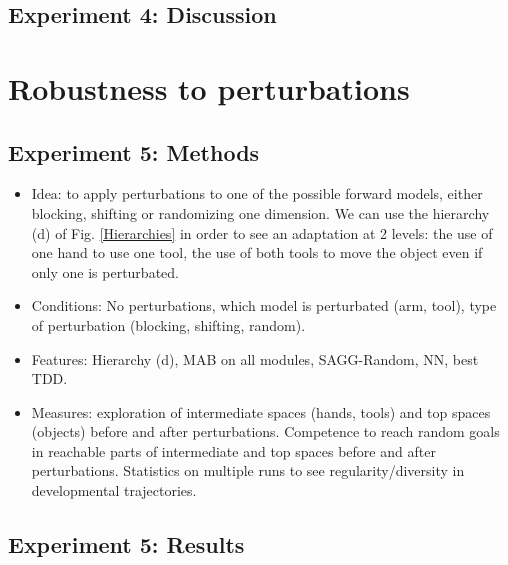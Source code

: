 \documentclass[conference]{include/IEEEtran}
\begin{document}
		
	
	\subsection{Experiment 4: Discussion}	
	
	

%
	
\section{Robustness to perturbations}

	
	\subsection{Experiment 5: Methods}	
		
		\begin{itemize}
			\item Idea: to apply perturbations to one of the possible forward models, either blocking, shifting or randomizing one dimension. 
					We can use the hierarchy (d) of Fig. \ref{Hierarchies} in order to see an adaptation at 2 levels: the use of one hand to use one tool, the use of both tools to move the object even if only one is perturbated.
			
			\item Conditions: No perturbations, which model is perturbated (arm, tool), type of perturbation (blocking, shifting, random).
			
			\item Features: Hierarchy (d), MAB on all modules, SAGG-Random, NN, best TDD.
			
			\item Measures: exploration of intermediate spaces (hands, tools) and top spaces (objects) before and after perturbations. 
					Competence to reach random goals in reachable parts of intermediate and top spaces before and after perturbations. 
					Statistics on multiple runs to see regularity/diversity in developmental trajectories.
		\end{itemize}
		

	\subsection{Experiment 5: Results}
	
\end{document}
